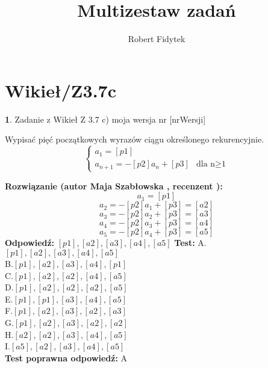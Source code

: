 \documentclass[12pt, a4paper]{article}
\title{Multizestaw zadań}
\author{Robert Fidytek}
\date{}
\theoremstyle{definition} %
\newtheorem{zad}{}
\newcommand{\kategoria}[1]{\section{#1}} %
\newcommand{\zadStart}[1]{\begin{zad}#1\newline} %
\newcommand{\zadStop}{\end{zad}}   %
\newcommand{\rozwStart}[2]{\noindent \textbf{Rozwiązanie (autor #1 , recenzent #2): }\newline} %
\newcommand{\rozwStop}{\newline}                                            %
\newcommand{\odpStart}{\noindent \textbf{Odpowiedź:}\newline}    %
\newcommand{\odpStop}{\newline}                                             %
\newcommand{\testStart}{\noindent \textbf{Test:}\newline} %
\newcommand{\testStop}{\newline} %
\newcommand{\kluczStart}{\noindent \textbf{Test poprawna odpowiedź:}\newline} %
\newcommand{\kluczStop}{\newline} %
\begin{document}
\maketitle


\kategoria{Wikieł/Z3.7c}
\zadStart{Zadanie z Wikieł Z 3.7 c)  moja wersja nr [nrWersji]}

Wypisać pięć początkowych wyrazów ciągu określonego rekurencyjnie.
$$\left\{ \begin{array}{ll}
a_{1}=[p1]\\
a_{n+1}=-[p2]a_{n}+[p3]& \textrm{dla n$\geq$1} 
\end{array} \right.
$$
\zadStop
\rozwStart{Maja Szabłowska}{}
$$a_{1}=[p1]$$
$$a_{2}=-[p2]a_{1}+[p3]=[a2]$$
$$a_{3}=-[p2]a_{2}+[p3]=[a3]$$
$$a_{4}=-[p2]a_{3}+[p3]=[a4]$$
$$a_{5}=-[p2]a_{4}+[p3]=[a5]$$
\rozwStop
\odpStart
$[p1],[a2],[a3],[a4],[a5]$
\odpStop
\testStart
A.$[p1],[a2],[a3],[a4],[a5]$\\
B.$[p1],[a2],[a3],[a4],[p1]$\\
C.$[p1],[a2],[a2],[a4],[a5]$\\
D.$[p1],[a2],[a2],[a2],[a5]$\\
E.$[p1],[p1],[a3],[a4],[a5]$\\
F.$[p1],[a2],[a3],[a2],[a3]$\\
G.$[p1],[a2],[a3],[a2],[a2]$\\
H.$[a2],[a2],[a3],[a4],[a5]$\\
I.$[a5],[a2],[a3],[a4],[a5]$\\
\testStop
\kluczStart
A
\kluczStop
\end{document}
